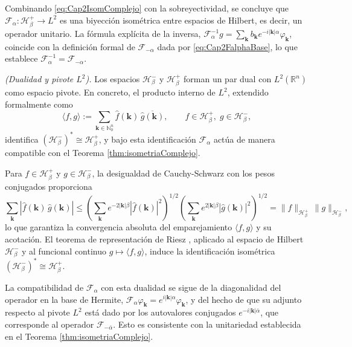 \begin{Proof}
                Combinando \eqref{eq:Cap2IsomComplejo} con la sobreyectividad, se concluye que $\mathcal{F}_\alpha : \mathcal{H}_\beta^+\to L^2$ es una biyección isométrica entre espacios de Hilbert, es decir, un operador unitario. La fórmula explícita de la inversa, $\mathcal{F}_\alpha^{-1} g = \sum_{\boldsymbol{k}} b_{\boldsymbol{k}} e^{-i|\boldsymbol{k}|\alpha}\varphi_{\boldsymbol{k}}$, coincide con la definición formal de $\mathcal{F}_{-\alpha}$ dada por \eqref{eq:Cap2FalphaBase}, lo que establece $\mathcal{F}_\alpha^{-1}=\mathcal{F}_{-\alpha}$.
            \end{Proof}

            \begin{corollary}\label{cor:dualidad}
                \textit{(Dualidad y pivote $L^2$).} Los espacios $\mathcal{H}_\beta^-$ y $\mathcal{H}_\beta^+$ forman un par dual con $L^2(\mathbb{R}^n)$ como espacio pivote. En concreto, el producto interno de $L^2$, extendido formalmente como
                \begin{equation*}
                    \langle f, g\rangle := \sum_{\boldsymbol{k}\in\mathbb{N}_0^n}\hat{f}(\boldsymbol{k})\,\overline{\hat{g}(\boldsymbol{k})},\qquad f\in\mathcal{H}_\beta^+,\; g\in\mathcal{H}_\beta^-,
                \end{equation*}
                identifica $(\mathcal{H}_\beta^-)^*\cong \mathcal{H}_\beta^+$, y bajo esta identificación $\mathcal{F}_\alpha$ actúa de manera compatible con el Teorema \ref{thm:isometriaComplejo}.
            \end{corollary}
            \begin{Proof}
                Para $f\in\mathcal{H}_\beta^+$ y $g\in\mathcal{H}_\beta^-$, la desigualdad de Cauchy-Schwarz con los pesos conjugados proporciona
                \begin{equation*}
                    \sum_{\boldsymbol{k}}|\hat{f}(\boldsymbol{k})\,\hat{g}(\boldsymbol{k})| \leq \left(\sum_{\boldsymbol{k}}e^{-2|\boldsymbol{k}|\beta}|\hat{f}(\boldsymbol{k})|^2\right)^{1/2}\left(\sum_{\boldsymbol{k}}e^{2|\boldsymbol{k}|\beta}|\hat{g}(\boldsymbol{k})|^2\right)^{1/2} = \|f\|_{\mathcal{H}_\beta^+}\,\|g\|_{\mathcal{H}_\beta^-},
                \end{equation*}
                lo que garantiza la convergencia absoluta del emparejamiento $\langle f, g\rangle$ y su acotación. El teorema de representación de Riesz \citep[Thm. 5.5]{brezis2011functional}, aplicado al espacio de Hilbert $\mathcal{H}_\beta^-$ y al funcional continuo $g\mapsto \langle f, g\rangle$, induce la identificación isométrica $(\mathcal{H}_\beta^-)^*\cong \mathcal{H}_\beta^+$.

                La compatibilidad de $\mathcal{F}_\alpha$ con esta dualidad se sigue de la diagonalidad del operador en la base de Hermite, $\mathcal{F}_\alpha\varphi_{\boldsymbol{k}} = e^{i|\boldsymbol{k}|\alpha}\varphi_{\boldsymbol{k}}$, y del hecho de que su adjunto respecto al pivote $L^2$ está dado por los autovalores conjugados $e^{-i|\boldsymbol{k}|\bar\alpha}$, que corresponde al operador $\mathcal{F}_{-\bar\alpha}$. Esto es consistente con la unitariedad establecida en el Teorema \ref{thm:isometriaComplejo}.
            \end{Proof}

